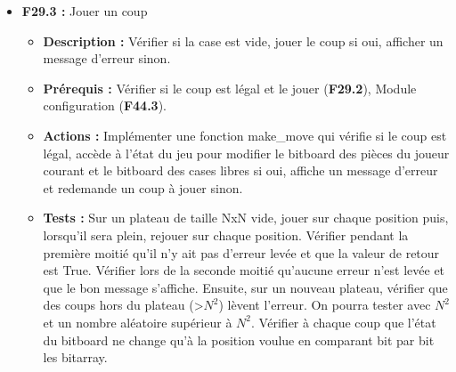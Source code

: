 \documentclass{article}
\begin{document}
\begin{itemize}
\begin{itemize}
\begin{itemize}
            \begin{itemize}
                \item \textbf{Description :} Le programme doit savoir si un coup est légal ou non.
                \item \textbf{Prérequis :} Récupérer le coup de l'utilisateur (\textbf{F29.1}).
                \item \textbf{Actions :} Implémenter une fonction check\_legal\_move qui renvoie True si un coup est légal en utilisant le module défini par \textbf{F43} selon l’algorithme de \ref{bitalgo}. Cette fonction doit lever une exception si le coup est hors du plateau. Elle renvoie False et affiche "Space already occupied" quand la case est déjà occupée.
                \item \textbf{Tests :} Test général spécifié juste en dessous au besoin \textbf{F29.3}.
            \end{itemize}
            \smallskip
            \item \textbf{F29.3 :} Jouer un coup
            \begin{itemize}
                \item \textbf{Description :} Vérifier si la case est vide, jouer le coup si oui, afficher un message d’erreur sinon.
                \item \textbf{Prérequis :} Vérifier si le coup est légal et le jouer (\textbf{F29.2}), Module configuration (\textbf{F44.3}).
                \item \textbf{Actions :} Implémenter une fonction make\_move qui vérifie si le coup est légal, accède à l’état du jeu pour modifier le bitboard des pièces du joueur courant et le bitboard des cases libres si oui, affiche un message d’erreur et redemande un coup à jouer sinon.
                \item \textbf{Tests :} Sur un plateau de taille NxN vide, jouer sur chaque position puis, lorsqu'il sera plein, rejouer sur chaque position. Vérifier pendant la première moitié qu'il n'y ait pas d'erreur levée et que la valeur de retour est True. Vérifier lors de la seconde moitié qu'aucune erreur n'est levée et que le bon message s'affiche. Ensuite, sur un nouveau plateau, vérifier que des coups hors du plateau (>$N^2$) lèvent l'erreur. On pourra tester avec $N^2$ et un nombre aléatoire supérieur à $N^2$. Vérifier à chaque coup que l'état du bitboard ne change qu'à la position voulue en comparant bit par bit les bitarray.
            \end{itemize}
            \smallskip

\end{itemize}
\end{itemize}
\end{itemize}
\end{document}
